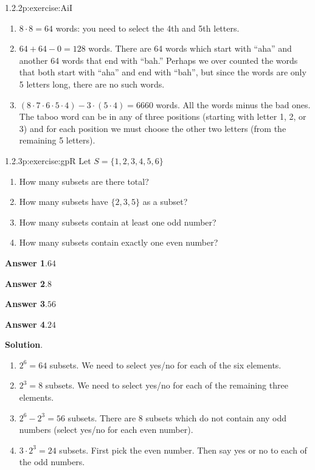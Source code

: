\documentclass[twoside,11pt,]{book}
\newcommand{\blocktitlefont}{\relax}
\numberwithin{equation}{chapter}
\begin{document}
\begin{divisionsolution}{1.2.2}{}{p:exercise:AiI}
\begin{enumerate}[label=(\alph*)]
\item{}\(8 \cdot 8 =64\) words: you need to select the 4th and 5th letters.%
\item{}\(64 + 64 - 0 = 128\) words. There are 64 words which start with ``aha'' and another 64 words that end with ``bah.'' Perhaps we over counted the words that both start with ``aha'' and end with ``bah'', but since the words are only 5 letters long, there are no such words.%
\item{}\((8\cdot 7\cdot 6\cdot 5\cdot 4) - 3\cdot (5\cdot 4) = 6660\) words. All the words minus the bad ones. The taboo word can be in any of three positions (starting with letter 1, 2, or 3) and for each position we must choose the other two letters (from the remaining 5 letters).%
\end{enumerate}
%
\end{divisionsolution}%
\begin{divisionsolution}{1.2.3}{}{p:exercise:gpR}%
Let \(S = \{1, 2, 3, 4, 5, 6\}\)%
\begin{enumerate}[label=(\alph*)]
\item{}How many subsets are there total?%
\item{}How many subsets have \(\{2,3,5\}\) as a subset?%
\item{}How many subsets contain at least one odd number?%
\item{}How many subsets contain exactly one even number?%
\end{enumerate}
%
\par\smallskip%
\noindent\textbf{\blocktitlefont Answer 1}.\quad{}\(64\)%
\par\smallskip%
\noindent\textbf{\blocktitlefont Answer 2}.\quad{}\(8\)%
\par\smallskip%
\noindent\textbf{\blocktitlefont Answer 3}.\quad{}\(56\)%
\par\smallskip%
\noindent\textbf{\blocktitlefont Answer 4}.\quad{}\(24\)%
\par\smallskip%
\noindent\textbf{\blocktitlefont Solution}.\quad{}%
\begin{enumerate}[label=(\alph*)]
\item{}\(2^6 = 64\) subsets. We need to select yes\slash{}no for each of the six elements.%
\item{}\(2^3 = 8\) subsets. We need to select yes\slash{}no for each of the remaining three elements.%
\item{}\(2^6 - 2^3 = 56\) subsets. There are 8 subsets which do not contain any odd numbers (select yes\slash{}no for each even number).%
\item{}\(3\cdot 2^3 = 24\) subsets. First pick the even number. Then say yes or no to each of the odd numbers.%
\end{enumerate}
%
\end{divisionsolution}%
\end{document}
